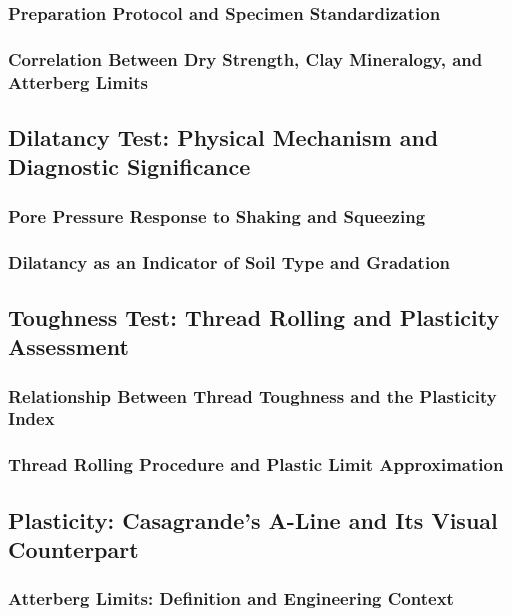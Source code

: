 \subsubsection{Preparation Protocol and Specimen Standardization}

\subsubsection{Correlation Between Dry Strength, Clay Mineralogy, and Atterberg Limits}

\subsection{Dilatancy Test: Physical Mechanism and Diagnostic Significance}

\subsubsection{Pore Pressure Response to Shaking and Squeezing}

\subsubsection{Dilatancy as an Indicator of Soil Type and Gradation}

\subsection{Toughness Test: Thread Rolling and Plasticity Assessment}

\subsubsection{Relationship Between Thread Toughness and the Plasticity Index}

\subsubsection{Thread Rolling Procedure and Plastic Limit Approximation}

\subsection{Plasticity: Casagrande's A-Line and Its Visual Counterpart}

\subsubsection{Atterberg Limits: Definition and Engineering Context}

